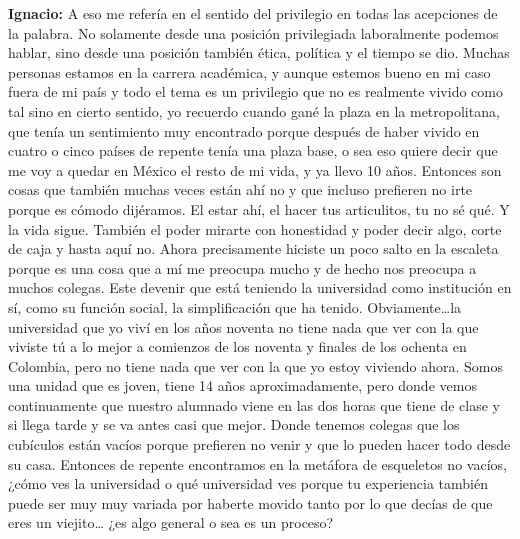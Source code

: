 \documentclass[
]{interact}
\begin{document}
\textbf{Ignacio:} A eso me refería en el sentido del privilegio en todas
las acepciones de la palabra. No solamente desde una posición
privilegiada laboralmente podemos hablar, sino desde una posición
también ética, política y el tiempo se dio. Muchas personas estamos en
la carrera académica, y aunque estemos bueno en mi caso fuera de mi país
y todo el tema es un privilegio que no es realmente vivido como tal sino
en cierto sentido, yo recuerdo cuando gané la plaza en la metropolitana,
que tenía un sentimiento muy encontrado porque después de haber vivido
en cuatro o cinco países de repente tenía una plaza base, o sea eso
quiere decir que me voy a quedar en México el resto de mi vida, y ya
llevo 10 años. Entonces son cosas que también muchas veces están ahí no
y que incluso prefieren no irte porque es cómodo dijéramos. El estar
ahí, el hacer tus articulitos, tu no sé qué. Y la vida sigue. También el
poder mirarte con honestidad y poder decir algo, corte de caja y hasta
aquí no. Ahora precisamente hiciste un poco salto en la escaleta porque
es una cosa que a mí me preocupa mucho y de hecho nos preocupa a muchos
colegas. Este devenir que está teniendo la universidad como institución
en sí, como su función social, la simplificación que ha tenido.
Obviamente\ldots la universidad que yo viví en los años noventa no tiene
nada que ver con la que viviste tú a lo mejor a comienzos de los noventa
y finales de los ochenta en Colombia, pero no tiene nada que ver con la
que yo estoy viviendo ahora. Somos una unidad que es joven, tiene 14
años aproximadamente, pero donde vemos continuamente que nuestro
alumnado viene en las dos horas que tiene de clase y si llega tarde y se
va antes casi que mejor. Donde tenemos colegas que los cubículos están
vacíos porque prefieren no venir y que lo pueden hacer todo desde su
casa. Entonces de repente encontramos en la metáfora de esqueletos no
vacíos, ¿cómo ves la universidad o qué universidad ves porque tu
experiencia también puede ser muy muy variada por haberte movido tanto
por lo que decías de que eres un viejito\ldots{} ¿es algo general o sea
es un proceso?
\end{document}
